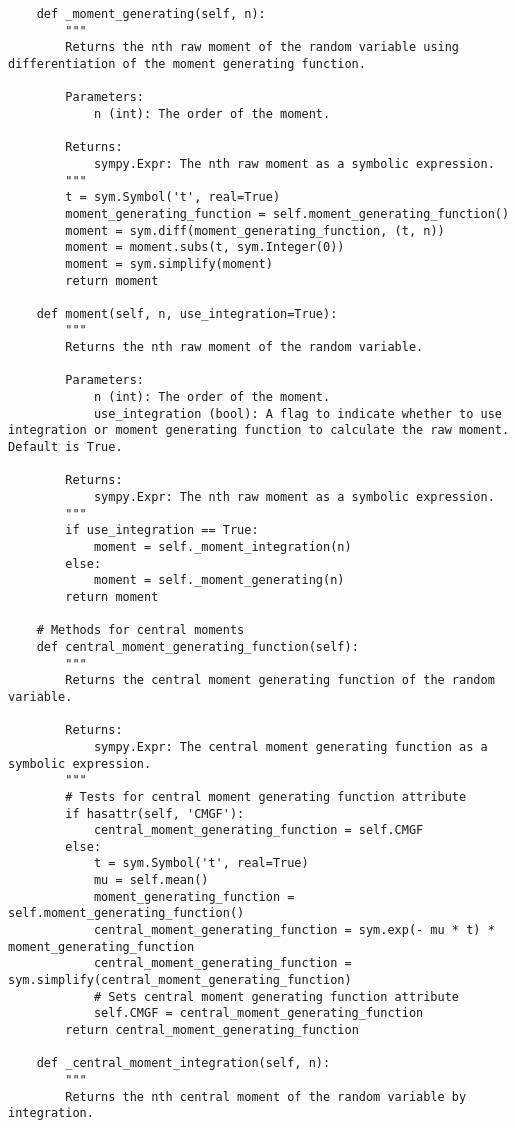 \begin{small}
\begin{lstlisting}
    def _moment_generating(self, n):
        """
        Returns the nth raw moment of the random variable using differentiation of the moment generating function.

        Parameters:
            n (int): The order of the moment.

        Returns:
            sympy.Expr: The nth raw moment as a symbolic expression.
        """
        t = sym.Symbol('t', real=True)
        moment_generating_function = self.moment_generating_function()
        moment = sym.diff(moment_generating_function, (t, n))
        moment = moment.subs(t, sym.Integer(0))
        moment = sym.simplify(moment)
        return moment

    def moment(self, n, use_integration=True):
        """
        Returns the nth raw moment of the random variable.

        Parameters:
            n (int): The order of the moment.
            use_integration (bool): A flag to indicate whether to use integration or moment generating function to calculate the raw moment. Default is True.

        Returns:
            sympy.Expr: The nth raw moment as a symbolic expression.
        """
        if use_integration == True:
            moment = self._moment_integration(n)
        else:
            moment = self._moment_generating(n)
        return moment

    # Methods for central moments
    def central_moment_generating_function(self):
        """
        Returns the central moment generating function of the random variable.

        Returns:
            sympy.Expr: The central moment generating function as a symbolic expression.
        """
        # Tests for central moment generating function attribute
        if hasattr(self, 'CMGF'):
            central_moment_generating_function = self.CMGF
        else:
            t = sym.Symbol('t', real=True)
            mu = self.mean()
            moment_generating_function = self.moment_generating_function()
            central_moment_generating_function = sym.exp(- mu * t) * moment_generating_function
            central_moment_generating_function = sym.simplify(central_moment_generating_function)
            # Sets central moment generating function attribute
            self.CMGF = central_moment_generating_function
        return central_moment_generating_function

    def _central_moment_integration(self, n):
        """
        Returns the nth central moment of the random variable by integration.


\end{lstlisting}
\end{small}
